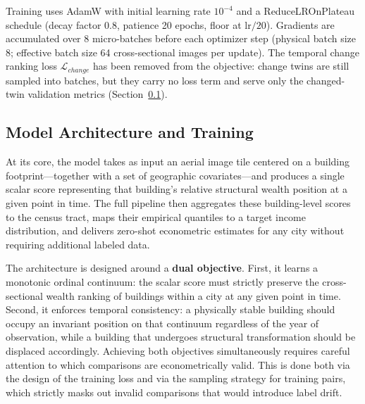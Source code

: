 \documentclass[conference]{IEEEtran}
\begin{document}
Training uses AdamW with initial learning rate $10^{-4}$ and a ReduceLROnPlateau schedule (decay factor 0.8, patience 20 epochs, floor at $\mathrm{lr}/20$). Gradients are accumulated over 8 micro-batches before each optimizer step (physical batch size 8; effective batch size 64 cross-sectional images per update). The temporal change ranking loss $\mathcal{L}_{change}$ has been removed from the objective: change twins are still sampled into batches, but they carry no loss term and serve only the changed-twin validation metrics (Section~\ref{sec:model}).

\subsection{Model Architecture and Training}
\label{sec:model}

At its core, the model takes as input an aerial image tile centered on a building footprint---together with a set of geographic covariates---and produces a single scalar score representing that building's relative structural wealth position at a given point in time. The full pipeline then aggregates these building-level scores to the census tract, maps their empirical quantiles to a target income distribution, and delivers zero-shot econometric estimates for any city without requiring additional labeled data.

The architecture is designed around a \textbf{dual objective}. First, it learns a monotonic ordinal continuum: the scalar score must strictly preserve the cross-sectional wealth ranking of buildings within a city at any given point in time. Second, it enforces temporal consistency: a physically stable building should occupy an invariant position on that continuum regardless of the year of observation, while a building that undergoes structural transformation should be displaced accordingly. Achieving both objectives simultaneously requires careful attention to which comparisons are econometrically valid. This is done both via the design of the training loss and via the sampling strategy for training pairs, which strictly masks out invalid comparisons that would introduce label drift.

\end{document}
